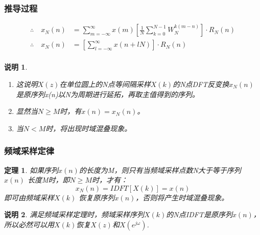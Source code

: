 \documentclass[notheorems,compress,mathserif,table]{beamer}
\newtheorem{theorem}{定理}
\newtheorem{shuoming}{说明}
\begin{document}
\begin{frame}[shrink]\frametitle{推导过程}%
\begin{equation*}
\begin{split}
\therefore\quad x_N(n)  &= \sum_{m=-\infty}^{\infty}x(m)\left[\frac{1}{N}\sum_{k=0}^{N-1}W_N^{k(m-n)}\right]\cdot R_N(n)\\
\therefore\quad   x_N(n)      &= \left[\sum_{l=-\infty}^{\infty}x(n+l N)\right]\cdot R_N(n)\\
\end{split}
\end{equation*}

\begin{shuoming}
\begin{enumerate}
	\item 这说明$ X(z) $在单位圆上的N点等间隔采样$X(k)$的N点DFT反变换$ x_N(n) $
	      是原序列x(n)以N为周期进行延拓，再取主值得到的序列。
	\item 显然当$ N\geq M $时，有$ x(n) = x_N(n) $。
	\item 当$ N < M $时，将出现时域混叠现象。
\end{enumerate}
	
\end{shuoming}



\end{frame}




\begin{frame}[shrink]\frametitle{频域采样定律}
\begin{theorem}%
	如果序列$ x(n) $的长度为M，则只有当频域采样点数N大于等于序列$x(n)$ 长度M时，即$N\geq M$时，才有：
	$$x_N(n) = IDFT[X(k)] = x(n)$$
	即可由频域采样$X(k)$ 恢复原序列$x(n)$，否则将产生时域混叠现象。
\end{theorem}
\begin{shuoming}
满足频域采样定理时，频域采样序列$ X(k) $的N点IDFT是原序列$x(n)$，所以必然可以用$ X(k) $恢复$ X(z) $和$ X(e^{j\omega}) $.
\end{shuoming}
\end{frame}
\end{document}
